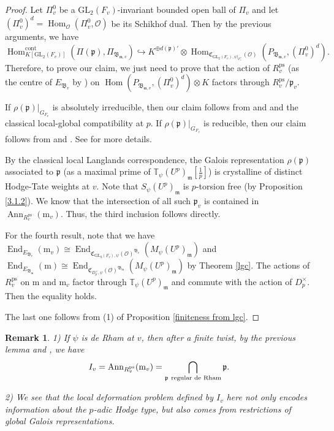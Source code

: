 \documentclass[a4paper, 12pt]{amsart}
\newtheorem{rem}[thm]{\bf Remark}
\DeclareMathOperator{\Hom}{Hom}
\DeclareMathOperator{\End}{End}
\def\cont{\mathrm{cont}}
\def\ps{\mathrm{ps}}
\newcommand{\T}{\mathbb{T}}
\newcommand{\GL}{\mathrm{GL}}
\newcommand{\cO}{\mathcal{O}}
\newcommand{\kp}{\mathfrak{p}}
\newcommand{\kC}{\mathfrak{C}}
\newcommand{\kB}{\mathfrak{B}}
\newcommand{\km}{\mathfrak{m}}
\newcommand{\mm}{\mathrm{m}}
\begin{document}
\begin{proof}
    	Let $\Pi_v^0$ be a $\GL_2(F_v)$-invariant bounded open ball of $\Pi_v$ and let $(\Pi_v^0)^d=\Hom_\cO(\Pi_v^0,\cO)$ be its Schikhof dual. Then by the previous arguments, we have
    	\[\Hom^{\cont}_{K[\GL_2(F_v)]}(\Pi(\kp),\Pi_{\kB_{\km,v}})\hookrightarrow  K^{\oplus d(\kp)'}\otimes \Hom_{\kC_{\GL_2(F_v),\psi|_{F_v^\times}}(\cO)}(P_{\kB_{\km,v}},(\Pi_v^0)^d).\]
    	Therefore, to prove our claim, we just need to prove that the action of $R_v^\ps$ (as the centre of $E_{\kB_v} $ by \cite[Theorem A.2.2]{Zhang:2024aa}) on $\Hom(P_{\kB_{\km,v}},(\Pi_v^0)^d)\otimes K$ factors through $R_v^\ps/\kp_v$.
    	
    	If $\rho(\kp)|_{G_{F_v}}$ is absolutely irreducible, then our claim follows from \cite[Proposition 4.37]{Pa_k_nas_2013} and \cite[Proposition 6.11]{Pa_k_nas_2021} and the classical local-global compatibility at $p$. If $\rho(\kp)|_{G_{F_v}}$ is reducible, then our claim follows from \cite[Proposition 4.37]{Pa_k_nas_2013} and \cite[Corollary 6.10]{Pa_k_nas_2021}. See \cite[page 1061]{pan2022fontaine} for more details.
    	
    	 By the classical local Langlands correspondence, the Galois representation $\rho(\kp)$ associated to $\kp$ (as a maximal prime of $\T_\psi(U^p)_\km[\frac{1}{p}]$) is crystalline of distinct Hodge-Tate weights at $v$. Note that $S_{\psi}(U^p)_\km$ is $p$-torsion free (by Proposition \ref{3.1.2}). We know that the intersection of all such $\kp_v$ is contained in $\operatorname{Ann}_{R_v^\ps}(\mm_v)$. Thus, the third inclusion follows directly.
    	
    	For the fourth result, note that we have $\End_{E_{\kB_v}}(\mm_v) \cong \End_{\kC_{\GL_2(F_v),\psi}(\cO)^{\kB_v}}(M_\psi(U^p)_\km)$ and $\End_{E_{\kB_\km}}(\mm) \cong \End_{\kC_{D_p^\times,\psi}(\cO)^{\kB_\km}}(M_\psi(U^p)_\km)$ by Theorem \ref{lgc}. The actions of $R_v^\ps$  on $\mm$ and $\mm_v$ factor through $\T_\psi(U^p)_\km$ and commute with the action of $D_p^\times$. Then the equality holds.
    	
    	The last one follows from (1) of Proposition \ref{finiteness from lgc}.
    \end{proof}
    
    \begin{rem}\label{de Rham}
    	1) If $\psi$ is de Rham at $v$, then after a finite twist, by the previous lemma and \cite[3.2.2]{pan2022fontaine}, we have 
    	$$
    	I_v = \operatorname{Ann}_{R_v^\ps}(\mm_v) = \bigcap_{\kp~\textnormal{regular de Rham}} \kp. $$
    	
    	2) We see that the local deformation problem defined by $I_v$ here not only encodes information about the $p$-adic Hodge type, but also comes from restrictions of global Galois representations.
    \end{rem}
    
\end{document}

